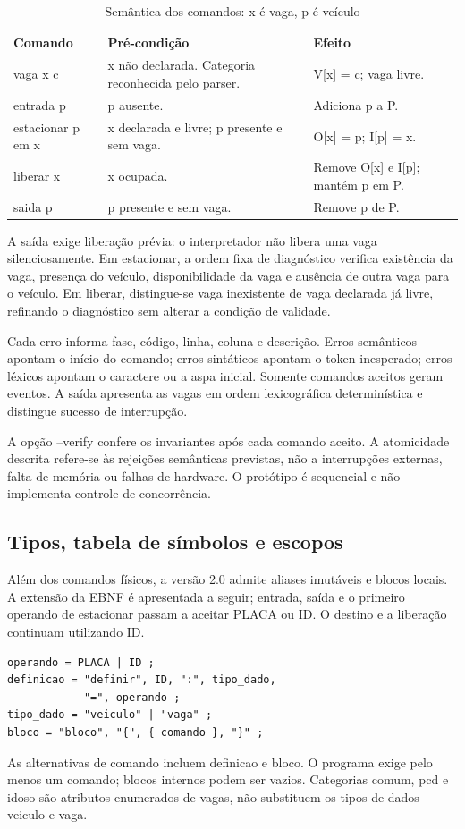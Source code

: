 \documentclass[conference,a4paper]{IEEEtran}
\begin{document}
\begin{table}[!t]
\centering
\footnotesize
\setlength{\tabcolsep}{4pt}
\renewcommand{\arraystretch}{1.15}
\caption{Semântica dos comandos: x é vaga, p é veículo}
\label{tab:t2}
\begin{tabularx}{\textwidth}{@{}p{}YY@{}}
\toprule
\textbf{Comando} & \textbf{Pré-condição} & \textbf{Efeito} \\
\midrule
vaga x c & x não declarada. Categoria reconhecida pelo parser. & V[x] = c; vaga livre. \\
entrada p & p ausente. & Adiciona p a P. \\
estacionar p em x & x declarada e livre; p presente e sem vaga. & O[x] = p; I[p] = x. \\
liberar x & x ocupada. & Remove O[x] e I[p]; mantém p em P. \\
saida p & p presente e sem vaga. & Remove p de P. \\
\bottomrule
\end{tabularx}
\end{table}

A saída exige liberação prévia: o interpretador não libera uma vaga silenciosamente. Em estacionar, a ordem fixa de diagnóstico verifica existência da vaga, presença do veículo, disponibilidade da vaga e ausência de outra vaga para o veículo. Em liberar, distingue-se vaga inexistente de vaga declarada já livre, refinando o diagnóstico sem alterar a condição de validade.


Cada erro informa fase, código, linha, coluna e descrição. Erros semânticos apontam o início do comando; erros sintáticos apontam o token inesperado; erros léxicos apontam o caractere ou a aspa inicial. Somente comandos aceitos geram eventos. A saída apresenta as vagas em ordem lexicográfica determinística e distingue sucesso de interrupção.


A opção --verify confere os invariantes após cada comando aceito. A atomicidade descrita refere-se às rejeições semânticas previstas, não a interrupções externas, falta de memória ou falhas de hardware. O protótipo é sequencial e não implementa controle de concorrência.


\subsection{Tipos, tabela de símbolos e escopos}
Além dos comandos físicos, a versão 2.0 admite aliases imutáveis e blocos locais. A extensão da EBNF é apresentada a seguir; entrada, saída e o primeiro operando de estacionar passam a aceitar PLACA ou ID. O destino e a liberação continuam utilizando ID.
\begin{lstlisting}[caption={Extensão da gramática para tipos e escopos.}]
operando = PLACA | ID ;
definicao = "definir", ID, ":", tipo_dado,
            "=", operando ;
tipo_dado = "veiculo" | "vaga" ;
bloco = "bloco", "{", { comando }, "}" ;
\end{lstlisting}
As alternativas de comando incluem definicao e bloco. O programa exige pelo menos um comando; blocos internos podem ser vazios. Categorias comum, pcd e idoso são atributos enumerados de vagas, não substituem os tipos de dados veiculo e vaga.
\end{document}
